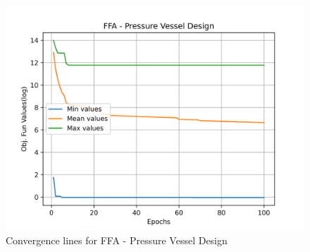 \begin{figure}[H]
\centering
\caption{Convergence lines for FFA - Pressure Vessel Design}
\label{fig:pressure_vessel_problem_solve_ffa}
\includegraphics[scale=0.5]{images/pressure_vessel_problem_solve_ffa.png}
\end{figure}
        